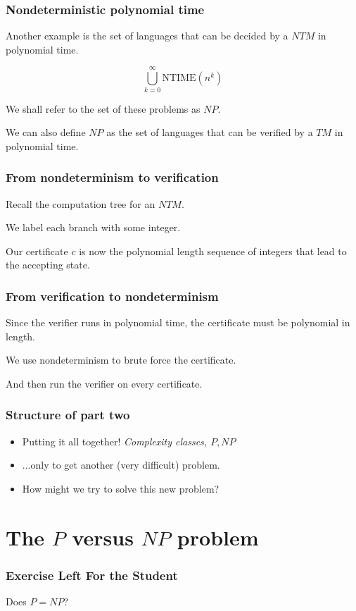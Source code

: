 \documentclass[aspectratio=169]{beamer}
\begin{document}
\begin{frame}
\frametitle{Nondeterministic polynomial time}
Another example is the set of languages that can be decided by a $NTM$ in polynomial time.

$$\bigcup_{k = 0}^{\infty} \mathrm{NTIME}(n^k)$$

We shall refer to the set of these problems as $NP$.

We can also define $NP$ as the set of languages that can be verified by a $TM$ in polynomial time.
\end{frame}

\begin{frame}
\frametitle{From nondeterminism to verification}
Recall the computation tree for an $NTM$.

We label each branch with some integer.

Our certificate $c$ is now the polynomial length sequence of integers that lead to the accepting state.
\end{frame}

\begin{frame}
\frametitle{From verification to nondeterminism}
Since the verifier runs in polynomial time, the certificate must be polynomial in length.

We use nondeterminism to brute force the certificate.

And then run the verifier on every certificate.
\end{frame}

\begin{frame}
\frametitle{Structure of part two}
\begin{itemize}
    \item Putting it all together! {\em Complexity classes, $P, NP$}
    \item ...only to get another (very difficult) problem.
    \item How might we try to solve this new problem?
\end{itemize}
\end{frame}

\section{The $P$ versus $NP$ problem}

\begin{frame}
\frametitle{Exercise Left For the Student}
\centerline{Does $P=NP$?}
\end{frame}
\end{document}
